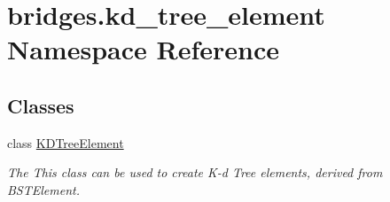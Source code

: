 \hypertarget{namespacebridges_1_1kd__tree__element}{}\section{bridges.\+kd\+\_\+tree\+\_\+element Namespace Reference}
\label{namespacebridges_1_1kd__tree__element}
\subsection*{Classes}
\begin{DoxyCompactItemize}
\item 
class \mbox{\hyperlink{classbridges_1_1kd__tree__element_1_1_k_d_tree_element}{K\+D\+Tree\+Element}}
\begin{DoxyCompactList}\small\item\em The This class can be used to create K-\/d Tree elements, derived from B\+S\+T\+Element. \end{DoxyCompactList}\end{DoxyCompactItemize}
